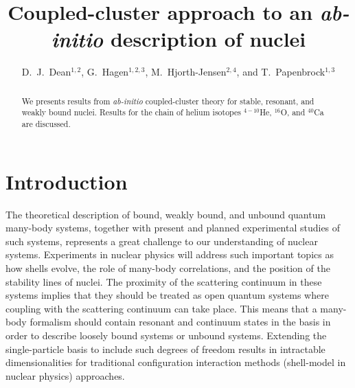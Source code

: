 \documentclass{ws-procs975x65}
\begin{document}
\title{Coupled-cluster approach to an {\it ab-initio} description of nuclei}

\author{D.~J.~Dean$^{1,2}$, G.~Hagen$^{1,2,3}$, M.~Hjorth-Jensen$^{2,4}$, and T.~Papenbrock$^{1,3}$}

\address{$^1$Physics Division, Oak Ridge National Laboratory, \\ P.O. Box 2008,
Oak Ridge, TN 37831, U.S.A.} 

\address{$^2$Center of Mathematics for Applications,
University of Oslo, N-0316 Oslo, Norway }

\address{$^3$Department of Physics and Astronomy, University of Tennessee,  \\
  Knoxville, Tennessee 37996, U.S.A. } 


\address{$^4$Department of Physics, University of Oslo, N-0316 Oslo, Norway}



\begin{abstract}
We presents results from {\it ab-initio} coupled-cluster theory for stable, 
resonant, and weakly bound nuclei. Results for the 
chain of helium isotopes $^{4-10}$He,
$^{16}$O, and $^{40}$Ca are discussed.  
\end{abstract}


\bodymatter

\section{Introduction}

The theoretical description of bound, weakly bound, and 
unbound quantum many-body systems, together with present and planned experimental studies
of such systems, represents a  great challenge to our understanding of nuclear systems.
Experiments in nuclear physics will address such important topics
as how shells evolve, the role of many-body correlations, and the position of
the stability lines of nuclei.
The proximity of the scattering continuum
in these systems implies that they should be treated as
open quantum systems where coupling with the scattering
continuum can take place. This means that a many-body formalism
should contain resonant and continuum states in the basis in order to describe
loosely bound systems or unbound systems.
Extending the single-particle basis to include such degrees of freedom results in intractable
dimensionalities for traditional configuration interaction methods (shell-model  in nuclear physics)  approaches.
\end{document}
